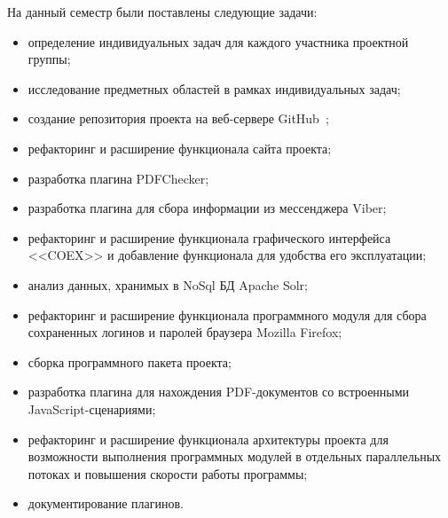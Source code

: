На данный семестр были поставлены следующие задачи:

\begin{itemize}
  \item определение индивидуальных задач для каждого участника проектной группы;
  \item исследование предметных областей в рамках индивидуальных задач; 
  \item создание репозитория проекта на веб-сервере GitHub~\cite{github};
  \item рефакторинг и расширение функционала сайта проекта;
  \item разработка плагина PDFChecker;
  \item разработка плагина для сбора информации из мессенджера Viber;
  \item рефакторинг и расширение функционала графического интерфейса <<COEX>> и добавление функционала для удобства его эксплуатации;
  \item анализ данных, хранимых в NoSql БД Apache Solr;
  \item рефакторинг и расширение функционала программного модуля для сбора сохраненных логинов и паролей браузера Mozilla Firefox;
  \item сборка программного пакета проекта;  
  \item разработка плагина для нахождения PDF-документов со встроенными JavaScript-сценариями;
  \item рефакторинг и расширение функционала архитектуры проекта для возможности выполнения программных модулей в отдельных параллельных потоках и повышения скорости работы программы;
  \item документирование плагинов.
\end{itemize}
